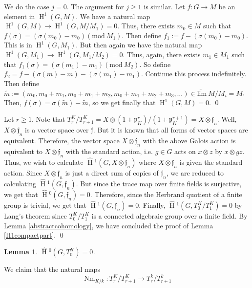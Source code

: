 \documentclass[11pt]{amsart}
\theoremstyle{plain}
\newtheorem{lemma}[theorem]{Lemma}
\newcommand{\HT}[1]{\hat{\HH}{}^{#1}}
\theoremstyle{definition}
\DeclareMathOperator{\HH}{H}
\DeclareMathOperator{\Nm}{Nm}
\begin{document}
\proof

We do the case $j = 0$.  The argument for $j \geq 1$ is similar.  Let
$f : G \rightarrow M$ be an element in $\HH^1(G,M)$.  We have a natural
map $\HH^1(G, M ) \rightarrow \HH^1(G, M / M_1) = 0$.  Thus, there exists
$m_0 \in M$ such that $f(\sigma) = (\sigma(m_0) - m_0) (\mathrm{mod} \
M_1)$.  Then define $f_1 := f - (\sigma(m_0) - m_0)$.  This is in
$\HH^1(G, M_1)$. But then again we have the natural map
$\HH^1(G, M_1) \rightarrow \HH^1(G, M_1 / M_2) = 0$.  Thus, again, there
exists $m_1 \in M_1$ such that $f_1(\sigma) = (\sigma(m_1) - m_1) (\mathrm{mod} \ M_2)$.
So define $f_2 = f - (\sigma(m) - m) - (\sigma(m_1) - m_1)$.  Continue
this process indefinitely.  Then define
$\tilde{m} := (m_0, m_0 + m_1, m_0 + m_1 + m_2, m_0 + m_1 + m_2
+ m_3, \ldots) \in \underleftarrow{\mathrm{lim}} \ M / M_i = M$.  Then,
$f(\sigma) = \sigma(\tilde{m}) - \tilde{m}$, so we get finally that
$\HH^1(G,M) = 0$.  \qed

Let $r \geq 1$.  Note that $T_r^K / T_{r+1}^K = X \otimes (1 +
\mathfrak{p}_K^r) / (1 + \mathfrak{p}_K^{r+1}) = X \otimes
\mathfrak{f}_n$.  Well, $X \otimes \mathfrak{f}_n$ is a vector space
over $\mathfrak{f}$.  But it is known that all forms of vector spaces
are equivalent.  Therefore, the vector space $X \otimes
\mathfrak{f}_n$ with the above Galois action is equivalent to $X
\otimes \mathfrak{f}_n$ with the standard action, i.e. $g \in G$ acts
on $x \otimes z$ by $x \otimes gz$.  Thus, we wish to calculate
$\HT{1}(G, X \otimes \mathfrak{f}_n)$ where $X \otimes
\mathfrak{f}_n$ is given the standard action.  Since $X \otimes
\mathfrak{f}_n$ is just a direct sum of copies of $\mathfrak{f}_n$, we
are reduced to calculating $\HT{1}(G, \mathfrak{f}_n)$.  But since
the trace map over finite fields is surjective, we get that
$\HT{0}(G, \mathfrak{f}_n) = 0$.  Therefore, since the Herbrand
quotient of a finite group is trivial, we get that $\HT{1}(G,
\mathfrak{f}_n) = 0$.  Finally, $\HT{1}(G, T_0^K / T_1^K) = 0$ by
Lang's theorem since $T_0^K / T_1^K$ is a connected algebraic group
over a finite field.  By Lemma \ref{abstractcohomology}, we have
concluded the proof of Lemma \ref{H1compactpart}.  \qed

\begin{lemma}\label{H0compactpart}
$\HT{0}(G,T_0^K) = 0$.
\end{lemma}

\proof
We claim that the natural maps
$$\Nm_{K/k} : T_r^K / T_{r+1}^K \rightarrow T_r^k / T_{r+1}^k$$
\end{document}
